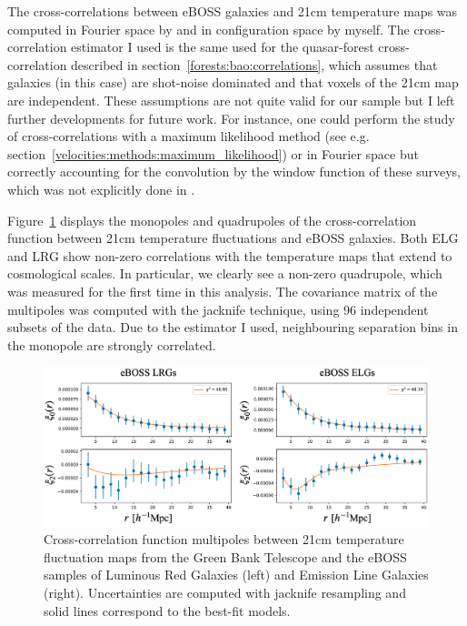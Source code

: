 The cross-correlations between eBOSS galaxies and 21cm temperature maps was computed 
in Fourier space by \cite{wolzConstraintsCrosscorrelationEBOSS2022} and in configuration space by myself. 
The cross-correlation estimator I used is the same used for the quasar-\lya forest cross-correlation 
described in section~\ref{forests:bao:correlations}, which assumes that galaxies (in this case)
are shot-noise dominated and that voxels of the 21cm map are independent. These assumptions are 
not quite valid for our sample but I left further developments for future work. 
For instance, one could perform 
the study of cross-correlations with a maximum likelihood method 
(see e.g. section~\ref{velocities:methods:maximum_likelihood}) 
or in Fourier space but correctly accounting for the convolution by the window function of 
these surveys, which was not explicitly done in \cite{wolzConstraintsCrosscorrelationEBOSS2022}.

Figure~\ref{fig:gbt_cross_correlation} displays the monopoles and quadrupoles of the cross-correlation function 
between 21cm temperature fluctuations and eBOSS galaxies. Both ELG and LRG show non-zero correlations with the 
temperature maps that extend to cosmological scales. 
In particular, we clearly see a non-zero quadrupole, which was measured for the first time in this analysis.  
The covariance matrix of the multipoles was computed with the jacknife technique, 
using 96 independent subsets of the data. Due to the estimator I used, neighbouring separation bins in the 
monopole are strongly correlated. 

\begin{figure}
    \centering 
    \includegraphics[width=\textwidth]{fig/galaxies/gbt_mono_quad.png}
    \caption{Cross-correlation function multipoles between 21cm temperature fluctuation maps from the Green Bank Telescope 
    and the eBOSS samples of Luminous Red Galaxies (left) and Emission Line Galaxies (right). 
    Uncertainties are computed with jacknife resampling and solid lines correspond to the best-fit models. 
    }
    \label{fig:gbt_cross_correlation}
\end{figure}

